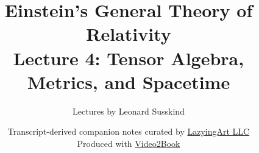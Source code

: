 \documentclass[11pt,oneside]{book}
\begin{document}
\frontmatter
\hypersetup{pageanchor=false}
\title{Einstein's General Theory of Relativity\\[0.45em]
\large Lecture 4: Tensor Algebra, Metrics, and Spacetime}
\author{Lectures by Leonard Susskind}
\date{Transcript-derived companion notes curated by
\href{https://lazying.art}{LazyingArt LLC}\\[0.35em]
\small Produced with
\href{https://github.com/lachlanchen/Video2Book}{Video2Book}}
\maketitle
\hypersetup{pageanchor=true}
\clearpage
\mainmatter

\end{document}
